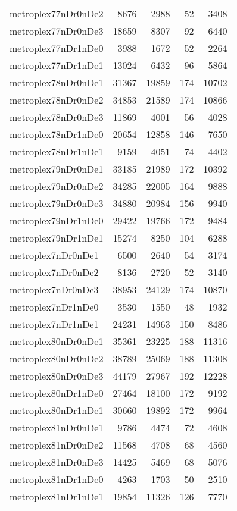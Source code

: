 \begin{longtable}{lrrrr}
metroplex77nDr0nDe2 & 8676 & 2988 & 52 & 3408 \\
metroplex77nDr0nDe3 & 18659 & 8307 & 92 & 6440 \\
metroplex77nDr1nDe0 & 3988 & 1672 & 52 & 2264 \\
metroplex77nDr1nDe1 & 13024 & 6432 & 96 & 5864 \\
metroplex78nDr0nDe1 & 31367 & 19859 & 174 & 10702 \\
metroplex78nDr0nDe2 & 34853 & 21589 & 174 & 10866 \\
metroplex78nDr0nDe3 & 11869 & 4001 & 56 & 4028 \\
metroplex78nDr1nDe0 & 20654 & 12858 & 146 & 7650 \\
metroplex78nDr1nDe1 & 9159 & 4051 & 74 & 4402 \\
metroplex79nDr0nDe1 & 33185 & 21989 & 172 & 10392 \\
metroplex79nDr0nDe2 & 34285 & 22005 & 164 & 9888 \\
metroplex79nDr0nDe3 & 34880 & 20984 & 156 & 9940 \\
metroplex79nDr1nDe0 & 29422 & 19766 & 172 & 9484 \\
metroplex79nDr1nDe1 & 15274 & 8250 & 104 & 6288 \\
metroplex7nDr0nDe1 & 6500 & 2640 & 54 & 3174 \\
metroplex7nDr0nDe2 & 8136 & 2720 & 52 & 3140 \\
metroplex7nDr0nDe3 & 38953 & 24129 & 174 & 10870 \\
metroplex7nDr1nDe0 & 3530 & 1550 & 48 & 1932 \\
metroplex7nDr1nDe1 & 24231 & 14963 & 150 & 8486 \\
metroplex80nDr0nDe1 & 35361 & 23225 & 188 & 11316 \\
metroplex80nDr0nDe2 & 38789 & 25069 & 188 & 11308 \\
metroplex80nDr0nDe3 & 44179 & 27967 & 192 & 12228 \\
metroplex80nDr1nDe0 & 27464 & 18100 & 172 & 9192 \\
metroplex80nDr1nDe1 & 30660 & 19892 & 172 & 9964 \\
metroplex81nDr0nDe1 & 9786 & 4474 & 72 & 4608 \\
metroplex81nDr0nDe2 & 11568 & 4708 & 68 & 4560 \\
metroplex81nDr0nDe3 & 14425 & 5469 & 68 & 5076 \\
metroplex81nDr1nDe0 & 4263 & 1703 & 50 & 2510 \\
metroplex81nDr1nDe1 & 19854 & 11326 & 126 & 7770 \\

\end{longtable}

